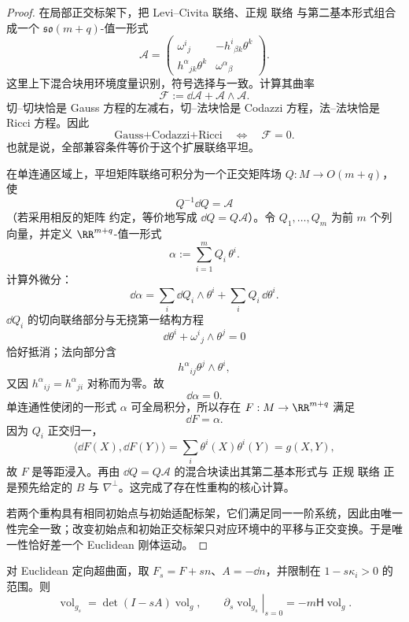 \begin{proof}
在局部正交标架下，把 Levi--Civita 联络、正规 联络 与第二基本形式组合成一个 $\mathfrak{so}(m+q)$-值一形式
\[
\mathcal A=
\begin{pmatrix}
\omega^i{}_j & -h^i{}_{\beta k}\theta^k\\
 h^\alpha{}_{jk}\theta^k & \omega^\alpha{}_{\beta}
\end{pmatrix}.
\]
这里上下混合块用环境度量识别，符号选择与一致。计算其曲率
\[
\mathcal F
:=\dd\mathcal A+\mathcal A\wedge\mathcal A.
\]
切--切块恰是 Gauss 方程的左减右，切--法块恰是 Codazzi 方程，法--法块恰是 Ricci 方程。因此
\begin{equation}
\text{Gauss+Codazzi+Ricci}
\quad\Longleftrightarrow\quad
\mathcal F=0.
\label{eq:math-dg-submanifold-flat-extended-connection}
\end{equation}
也就是说，全部兼容条件等价于这个扩展联络平坦。

在单连通区域上，平坦矩阵联络可积分为一个正交矩阵场 $Q:M\to O(m+q)$，使
\[
Q^{-1}\dd Q=\mathcal A
\]
（若采用相反的矩阵 约定，等价地写成 $\dd Q=Q\mathcal A$）。令 $Q_1,\ldots,Q_m$ 为前 $m$ 个列向量，并定义 $\RR^{m+q}$-值一形式
\[
\alpha:=\sum_{i=1}^m Q_i\,\theta^i.
\]
计算外微分：
\[
\dd\alpha
=\sum_i \dd Q_i\wedge\theta^i
+\sum_i Q_i\,\dd\theta^i.
\]
$\dd Q_i$ 的切向联络部分与无挠第一结构方程
\[
\dd\theta^i+\omega^i{}_j\wedge\theta^j=0
\]
恰好抵消；法向部分含
\[
h^\alpha{}_{ij}\theta^j\wedge\theta^i,
\]
又因 $h^\alpha{}_{ij}=h^\alpha{}_{ji}$ 对称而为零。故
\[
\dd\alpha=0.
\]
单连通性使闭的一形式 $\alpha$ 可全局积分，所以存在 $F:M\to\RR^{m+q}$ 满足
\[
\dd F=\alpha.
\]
因为 $Q_i$ 正交归一，
\[
\langle \dd F(X),\dd F(Y)\rangle
=\sum_i\theta^i(X)\theta^i(Y)=g(X,Y),
\]
故 $F$ 是等距浸入。再由 $\dd Q=Q\mathcal A$ 的混合块读出其第二基本形式与 正规 联络 正是预先给定的 $B$ 与 $\nabla^\perp$。这完成了存在性重构的核心计算。

若两个重构具有相同初始点与初始适配标架，它们满足同一一阶系统，因此由唯一性完全一致；改变初始点和初始正交标架只对应环境中的平移与正交变换。于是唯一性恰好差一个 Euclidean 刚体运动。
\end{proof}

\begin{proposition}[平行曲面的平均曲率响应]
对 Euclidean 定向超曲面，取 $F_s=F+sn$、$A=-\dd n$，并限制在 $1-s\kappa_i>0$ 的范围。则\[\operatorname{vol}_{g_s}=\det(I-sA)\operatorname{vol}_g,\qquad\left.\partial_s\operatorname{vol}_{g_s}\right|_{s=0}=-m\mathsf H\operatorname{vol}_g.\]
\end{proposition}

